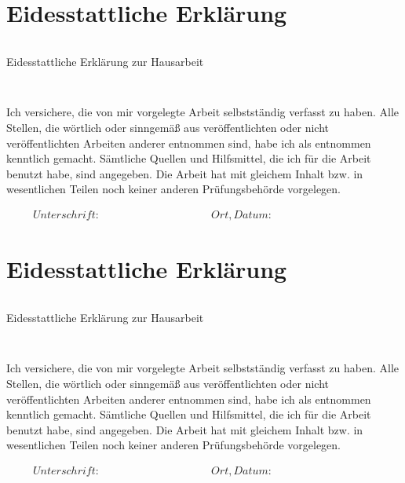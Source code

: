 \section*{Eidesstattliche Erklärung}
\thispagestyle{empty}

\begin{verbatim}

\end{verbatim}

\begin{LARGE}Eidesstattliche Erklärung zur Hausarbeit\end{LARGE}
\begin{verbatim}


\end{verbatim}
Ich versichere, die von mir vorgelegte Arbeit selbstständig verfasst zu 
haben. Alle Stellen, die wörtlich oder sinngemäß aus veröffentlichten 
oder nicht veröffentlichten Arbeiten anderer entnommen sind, habe ich 
als entnommen kenntlich gemacht. Sämtliche Quellen und Hilfsmittel, die 
ich für die Arbeit benutzt habe, sind angegeben. Die Arbeit hat mit 
gleichem Inhalt bzw. in wesentlichen Teilen noch keiner anderen 
Prüfungsbehörde vorgelegen.


\begin{displaymath}
\begin{array}{ll}
Unterschrift:~~~~~~~~~~~~~~~~~~~~~~~~~~~~~~~~~~~~~~~~~~
& Ort, Datum:~~~~~~~~~~~~~~~~~~~~~~~~~~~~~~~~~~~~~~~~~~
\end{array}
\end{displaymath}

\newpage


\section*{Eidesstattliche Erklärung}
\thispagestyle{empty}

\begin{verbatim}

\end{verbatim}

\begin{LARGE}Eidesstattliche Erklärung zur Hausarbeit\end{LARGE}
\begin{verbatim}


\end{verbatim}
Ich versichere, die von mir vorgelegte Arbeit selbstständig verfasst zu 
haben. Alle Stellen, die wörtlich oder sinngemäß aus veröffentlichten 
oder nicht veröffentlichten Arbeiten anderer entnommen sind, habe ich 
als entnommen kenntlich gemacht. Sämtliche Quellen und Hilfsmittel, die 
ich für die Arbeit benutzt habe, sind angegeben. Die Arbeit hat mit 
gleichem Inhalt bzw. in wesentlichen Teilen noch keiner anderen 
Prüfungsbehörde vorgelegen.


\begin{displaymath}
\begin{array}{ll}
Unterschrift:~~~~~~~~~~~~~~~~~~~~~~~~~~~~~~~~~~~~~~~~~~
& Ort, Datum:~~~~~~~~~~~~~~~~~~~~~~~~~~~~~~~~~~~~~~~~~~
\end{array}
\end{displaymath}
